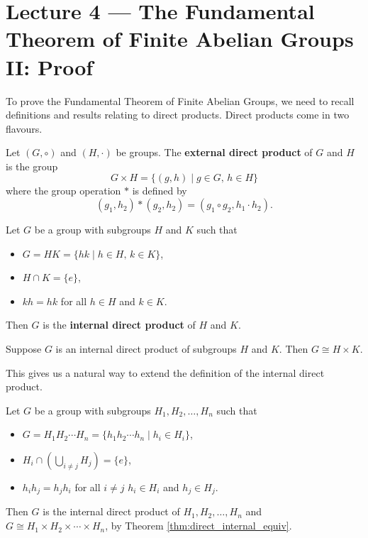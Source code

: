 \section{Lecture 4 — The Fundamental Theorem of Finite Abelian Groups II: Proof}

To prove the Fundamental Theorem of Finite Abelian Groups, we need to recall definitions and results relating to direct products. Direct products come in two flavours.

\begin{definition}
	Let $(G,\circ)$ and $(H,\cdot)$ be groups. The \textbf{external direct product} of $G$ and $H$ is the group
	$$G\times H=\{(g,h)\mid g\in G,\,h\in H\}$$
	where the group operation $*$ is defined by
	$$(g_1,h_2)*(g_2,h_2)=(g_1\circ g_2,h_1\cdot h_2).$$
\end{definition}

\begin{definition}
	Let $G$ be a group with subgroups $H$ and $K$ such that
	\begin{itemize}
		\item $G=HK=\{hk\mid h\in H,\,k\in K\}$,
		\item $H\cap K=\{e\}$,
		\item $kh=hk$ for all $h\in H$ and $k\in K$.
	\end{itemize}
	Then $G$ is the \textbf{internal direct product} of $H$ and $K$.
\end{definition}

\begin{theorem}\label{thm:direct_internal_equiv}
	Suppose $G$ is an internal direct product of subgroups $H$ and $K$. Then $G\cong H\times K$.
\end{theorem}

This gives us a natural way to extend the definition of the internal direct product.

Let $G$ be a group with subgroups $H_1,H_2,\hdots,H_n$ such that

\begin{itemize}
	\item $G=H_1H_2\cdots H_n=\{h_1h_2\cdots h_n\mid h_i\in H_i\}$,
	\item $H_i\cap \left(\bigcup_{i\neq j}H_j\right)=\{e\}$,
	\item $h_ih_j=h_jh_i$ for all $i\neq j$ $h_i\in H_i$ and $h_j\in H_j$.
\end{itemize}

Then $G$ is the internal direct product of  $H_1,H_2,\hdots,H_n$ and $G\cong H_1\times H_2\times\cdots\times H_n$, by Theorem \ref{thm:direct_internal_equiv}.


